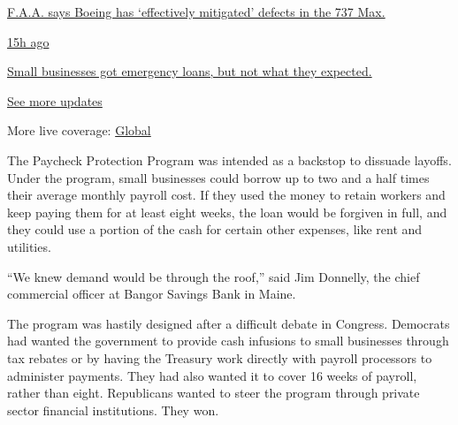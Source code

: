 \href{https://www.nytimes3xbfgragh.onion/live/2020/08/03/business/stock-market-today-coronavirus?action=click\&pgtype=Article\&state=default\&region=MAIN_CONTENT_1\&context=storylines_live_updates\#faa-says-boeing-has-effectively-mitigated-defects-in-the-737-max}{F.A.A.
says Boeing has `effectively mitigated' defects in the 737 Max.}

\href{https://www.nytimes3xbfgragh.onion/live/2020/08/03/business/stock-market-today-coronavirus?action=click\&pgtype=Article\&state=default\&region=MAIN_CONTENT_1\&context=storylines_live_updates\#small-businesses-got-emergency-loans-but-not-what-they-expected}{15h
ago}

\href{https://www.nytimes3xbfgragh.onion/live/2020/08/03/business/stock-market-today-coronavirus?action=click\&pgtype=Article\&state=default\&region=MAIN_CONTENT_1\&context=storylines_live_updates\#small-businesses-got-emergency-loans-but-not-what-they-expected}{Small
businesses got emergency loans, but not what they expected.}

\href{https://www.nytimes3xbfgragh.onion/live/2020/08/03/business/stock-market-today-coronavirus?action=click\&pgtype=Article\&state=default\&region=MAIN_CONTENT_1\&context=storylines_live_updates}{See
more updates}

More live coverage:
\href{https://www.nytimes3xbfgragh.onion/2020/08/03/world/coronavirus-covid-19.html?action=click\&pgtype=Article\&state=default\&region=MAIN_CONTENT_1\&context=storylines_live_updates}{Global}

The Paycheck Protection Program was intended as a backstop to dissuade
layoffs. Under the program, small businesses could borrow up to two and
a half times their average monthly payroll cost. If they used the money
to retain workers and keep paying them for at least eight weeks, the
loan would be forgiven in full, and they could use a portion of the cash
for certain other expenses, like rent and utilities.

``We knew demand would be through the roof,'' said Jim Donnelly, the
chief commercial officer at Bangor Savings Bank in Maine.

The program was hastily designed after a difficult debate in Congress.
Democrats had wanted the government to provide cash infusions to small
businesses through tax rebates or by having the Treasury work directly
with payroll processors to administer payments. They had also wanted it
to cover 16 weeks of payroll, rather than eight. Republicans wanted to
steer the program through private sector financial institutions. They
won.

